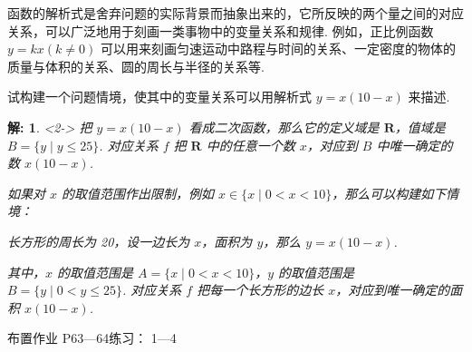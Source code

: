 \documentclass[aspectratio=169,13pt,t] {beamer}
\newtheorem*{solve}{解:}
\theoremstyle{definition}
\begin{document}
\begin{frame}
	\begin{example}
		 函数的解析式是舍弃问题的实际背景而抽象出来的，它所反映的两个量之间的对应关系，可以广泛地用于刻画一类事物中的变量关系和规律. 例如，正比例函数 \(y = kx (k \neq 0)\) 可以用来刻画匀速运动中路程与时间的关系、一定密度的物体的质量与体积的关系、圆的周长与半径的关系等.
		
		试构建一个问题情境，使其中的变量关系可以用解析式 \(y = x(10 - x)\) 来描述.
	\end{example}
\vspace{-2ex}
	\begin{solve}<2->
	把 \(y = x(10 - x)\) 看成二次函数，那么它的定义域是 \(\mathbf{R}\)，值域是 \(B = \{y \mid y \leqslant 25\}\). 对应关系 \(f\) 把 \(\mathbf{R}\) 中的任意一个数 \(x\)，对应到 \(B\) 中唯一确定的数 \(x(10 - x)\).
	
	如果对 \(x\) 的取值范围作出限制，例如 \(x \in \{x \mid 0 < x < 10\}\)，那么可以构建如下情境：
	
	长方形的周长为 20，设一边长为 \(x\)，面积为 \(y\)，那么 \(y = x(10 - x)\).
	
	其中，\(x\) 的取值范围是 \(A = \{x \mid 0 < x < 10\}\)，\(y\) 的取值范围是 \(B = \{y \mid 0 < y \leqslant 25\}\). 对应关系 \(f\) 把每一个长方形的边长 \(x\)，对应到唯一确定的面积 \(x(10 - x)\).
	\end{solve}
\end{frame}

\begin{frame}{布置作业}
	P63---64练习： 1---4
	
	
\end{frame}
\end{document}
